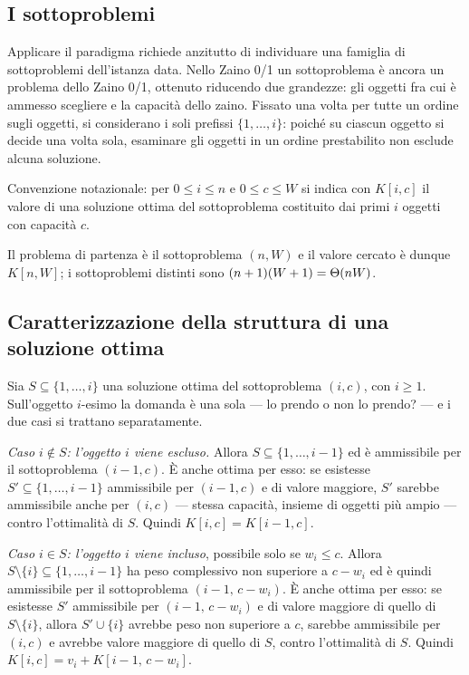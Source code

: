 \documentclass[11pt]{article}
\begin{document}
\subsection{I sottoproblemi}
Applicare il paradigma richiede anzitutto di individuare una famiglia di
sottoproblemi dell'istanza data. Nello Zaino 0/1 un sottoproblema \`e ancora un
problema dello Zaino 0/1, ottenuto riducendo due grandezze: gli oggetti fra cui
\`e ammesso scegliere e la capacit\`a dello zaino. Fissato una volta per tutte
un ordine sugli oggetti, si considerano i soli prefissi $\{1,\dots,i\}$:
poich\'e su ciascun oggetto si decide una volta sola, esaminare gli oggetti in
un ordine prestabilito non esclude alcuna soluzione.

Convenzione notazionale: per $0 \le i \le n$ e $0 \le c \le W$ si indica con
$K[i,c]$ il valore di una soluzione ottima del sottoproblema costituito dai
primi $i$ oggetti con capacit\`a $c$.

Il problema di partenza \`e il sottoproblema $(n,W)$ e il valore cercato \`e
dunque $K[n,W]$; i sottoproblemi distinti sono $(n+1)(W+1) = \Theta(nW)$.

\subsection{Caratterizzazione della struttura di una soluzione ottima}
Sia $S \subseteq \{1,\dots,i\}$ una soluzione ottima del sottoproblema $(i,c)$,
con $i \ge 1$. Sull'oggetto $i$-esimo la domanda \`e una sola --- lo prendo o
non lo prendo? --- e i due casi si trattano separatamente.

\emph{Caso $i \notin S$: l'oggetto $i$ viene escluso.} Allora
$S \subseteq \{1,\dots,i-1\}$ ed \`e ammissibile
per il sottoproblema $(i-1,c)$. \`E anche ottima per esso: se esistesse
$S' \subseteq \{1,\dots,i-1\}$ ammissibile per $(i-1,c)$ e di valore maggiore,
$S'$ sarebbe ammissibile anche per $(i,c)$ --- stessa capacit\`a, insieme di
oggetti pi\`u ampio --- contro l'ottimalit\`a di $S$. Quindi
$K[i,c] = K[i-1,c]$.

\emph{Caso $i \in S$: l'oggetto $i$ viene incluso}, possibile solo se
$w_i \le c$. Allora
$S \setminus \{i\} \subseteq \{1,\dots,i-1\}$ ha peso complessivo non superiore
a $c - w_i$ ed \`e quindi ammissibile per il sottoproblema $(i-1,\,c-w_i)$. \`E
anche ottima per esso: se esistesse $S'$ ammissibile per $(i-1,\,c-w_i)$ e di
valore maggiore di quello di $S \setminus \{i\}$, allora $S' \cup \{i\}$ avrebbe
peso non superiore a $c$, sarebbe ammissibile per $(i,c)$ e avrebbe valore
maggiore di quello di $S$, contro l'ottimalit\`a di $S$. Quindi
$K[i,c] = v_i + K[i-1,\,c-w_i]$.
\end{document}
